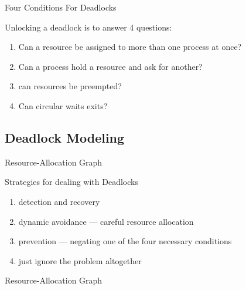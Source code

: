 \begin{frame}{Four Conditions For Deadlocks}
  \begin{block}{Unlocking a deadlock is to answer 4 questions:}
  \begin{enumerate}
  \item Can a resource be assigned to more than one process at once?
  \item Can a process hold a resource and ask for another?
  \item can resources be preempted?
  \item Can circular waits exits?
  \end{enumerate}    
  \end{block}
\end{frame}

\subsection{Deadlock Modeling}
\label{sec:deadlock-modeling}

\begin{frame}{Resource-Allocation Graph}
  \begin{center}
  \end{center}
  \begin{block}{Strategies for dealing with Deadlocks}
    \begin{enumerate}
    \item detection and recovery
    \item dynamic avoidance --- careful resource allocation
    \item prevention --- negating one of the four necessary conditions
    \item just ignore the problem altogether
    \end{enumerate}
  \end{block}
\end{frame}

\begin{frame}{Resource-Allocation Graph}
  \begin{minipage}{.49\linewidth}
    \begin{center}
       
    \end{center}
  \end{minipage}\hfill
  \begin{minipage}{.49\linewidth}
    \begin{center}
       
    \end{center}
  \end{minipage}
\end{frame}

